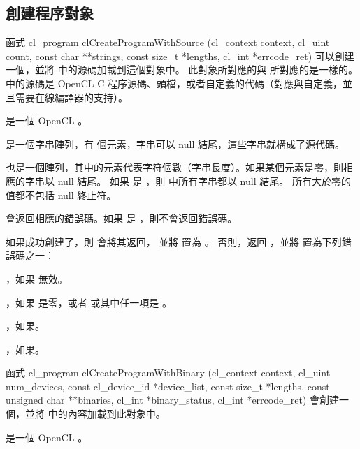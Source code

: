 \subsection{創建程序對象}

函式
\startCLFUNC
cl_program clCreateProgramWithSource (cl_context context,
			cl_uint count,
			const char **strings,
			const size_t *lengths,
			cl_int *errcode_ret)
\stopCLFUNC
可以創建一個，並將  中的源碼加載到這個對象中。
此對象所對應的與  所對應的是一樣的。
  中的源碼是 OpenCL C 程序源碼、頭檔，或者自定義的代碼（對應與自定義，並且需要在線編譯器的支持）。

 是一個 OpenCL 。

 是一個字串陣列，有  個元素，字串可以 null 結尾，這些字串就構成了源代碼。

 也是一個陣列，其中的元素代表字符個數（字串長度）。如果某個元素是零，則相應的字串以 null 結尾。
如果  是 ，則  中所有字串都以 null 結尾。
所有大於零的值都不包括 null 終止符。

 會返回相應的錯誤碼。如果  是 ，則不會返回錯誤碼。

如果成功創建了，則  會將其返回，
並將  置為 。
否則，返回 ，並將  置為下列錯誤碼之一：
\startigBase
\item {}，如果  無效。

\item {}，如果  是零，或者  或其中任一項是 。

\item {}，如果\scdevfailres。

\item {}，如果\schostfailres。
\stopigBase

函式
\startCLFUNC
cl_program clCreateProgramWithBinary (cl_context context,
			cl_uint num_devices,
			const cl_device_id *device_list,
			const size_t *lengths,
			const unsigned char **binaries,
			cl_int *binary_status,
			cl_int *errcode_ret)
\stopCLFUNC
會創建一個，並將  中的內容加載到此對象中。

 是一個 OpenCL 。

